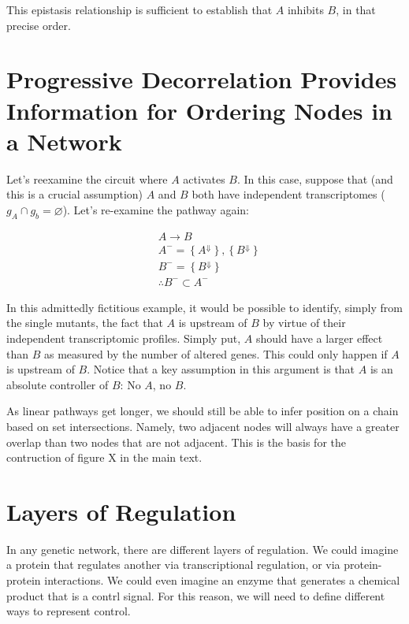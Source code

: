 \documentclass{article}
\newcommand{\transcr}[1]{\left \{ #1 \right \}}
\theoremstyle{definition}
\begin{document}
This epistasis relationship is sufficient to establish that $A$ inhibits $B$, in that precise order.

\section{Progressive Decorrelation Provides Information for Ordering Nodes in a Network}

Let's reexamine the circuit where $A$ activates $B$. In this case, suppose that (and this is a crucial assumption) $A$ and $B$ both have independent transcriptomes ($g_A \cap g_b = \varnothing$). Let's re-examine the pathway again:

\begin{equation}
  \begin{aligned}
    &A \rightarrow{} B\\
    &A^- = \transcr{A^\Downarrow}, \transcr{B^\Downarrow}\\
    &B^- = \transcr{B^\Downarrow}\\
    &\therefore B^- \subset A^-
  \end{aligned}
\end{equation}

In this admittedly fictitious example, it would be possible to identify, simply from the single mutants, the fact that $A$ is upstream of $B$ by virtue of their independent transcriptomic profiles. Simply put, $A$ should have a larger effect than $B$ as measured by the number of altered genes. This could only happen if $A$ is upstream of $B$. Notice that a key assumption in this argument is that $A$ is an absolute controller of $B$: No $A$, no $B$.

As linear pathways get longer, we should still be able to infer position on a chain based on set intersections. Namely, two adjacent nodes will always have a greater overlap than two nodes that are not adjacent. This is the basis for the contruction of figure X in the main text.


\section{Layers of Regulation}
\label{sec:Layers of Regulation}

In any genetic network, there are different layers of regulation. We could imagine a protein that regulates another via transcriptional regulation, or via protein-protein interactions. We could even imagine an enzyme that generates a chemical product that is a contrl signal. For this reason, we will need to define different ways to represent control.
\end{document}
